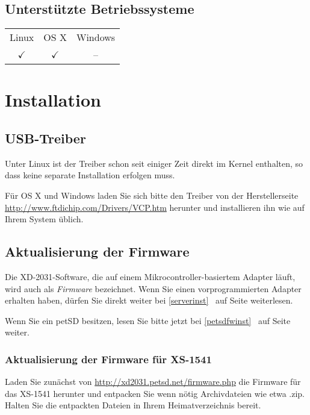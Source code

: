 \documentclass[10pt,a4paper]{scrartcl}		%
\newcommand{\fwbinaries}{\url{http://xd2031.petsd.net/firmware.php}}
\begin{document}
\subsection{Unterstützte Betriebssysteme}
\begin{tabular}[c]{c c c}
\toprule
Linux & OS X & Windows \\
$\checkmark$ & $\checkmark$ & -- \\
\bottomrule
\end{tabular}

\section{Installation}
\subsection{USB-Treiber}
Unter Linux ist der Treiber schon seit einiger Zeit direkt im Kernel
enthalten, so dass keine separate Installation erfolgen muss.

Für OS X und Windows laden Sie sich bitte den Treiber von der
Herstellerseite \url{http://www.ftdichip.com/Drivers/VCP.htm} 
herunter und installieren ihn wie auf Ihrem System üblich.

\subsection{Aktualisierung der Firmware}
Die XD-2031-Software, die auf einem Mikrocontroller-basiertem Adapter
läuft, wird auch als \textit{Firmware} bezeichnet.
Wenn Sie einen vorprogrammierten Adapter erhalten haben,
dürfen Sie direkt weiter bei \glqq\ref{serverinst} 
\grqq\ auf Seite \pageref{serverinst}  weiterlesen.

Wenn Sie ein petSD besitzen, lesen Sie bitte jetzt bei
\glqq\ref{petsdfwinst} \grqq\ auf Seite
\pageref{petsdfwinst} weiter.

\subsubsection{Aktualisierung der Firmware für XS-1541}
Laden Sie zunächst von \fwbinaries{} die Firmware für das XS-1541
herunter und entpacken Sie wenn nötig Archivdateien wie etwa \glqq .zip\grqq . 
Halten Sie die entpackten Dateien in Ihrem Heimatverzeichnis bereit.
\end{document}
